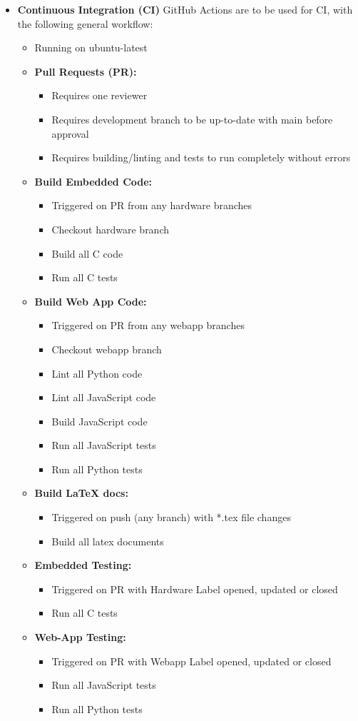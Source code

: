\documentclass{article}
\begin{document}
\begin{itemize}
\item \textbf{Continuous Integration (CI)} GitHub Actions are to be used for CI, with the following general workflow:
\begin{itemize}
    \item Running on ubuntu-latest
    \item \textbf{Pull Requests (PR):} 
    \begin{itemize}
        \item Requires one reviewer
        \item Requires development branch to be up-to-date with main before approval
        \item Requires building/linting and tests to run completely without errors
    \end{itemize}
    \item \textbf{Build Embedded Code:}
    \begin{itemize}
        \item Triggered on PR from any hardware branches
        \item Checkout hardware branch
        \item Build all C code
        \item Run all C tests
    \end{itemize}
    \item \textbf{Build Web App Code:} 
    \begin{itemize}
        \item Triggered on PR from any webapp branches
        \item Checkout webapp branch
        \item Lint all Python code
        \item Lint all JavaScript code
        \item Build JavaScript code
        \item Run all JavaScript tests
        \item Run all Python tests
    \end{itemize}
    \item \textbf{Build LaTeX docs:} 
    \begin{itemize}
        \item Triggered on push (any branch) with *.tex file changes
        \item Build all latex documents
    \end{itemize}
    \item \textbf{Embedded Testing:} 
    \begin{itemize}
        \item Triggered on PR with Hardware Label opened, updated or closed
        \item Run all C tests
    \end{itemize}
    \item \textbf{Web-App Testing:} 
    \begin{itemize}
        \item Triggered on PR with Webapp Label opened, updated or closed
        \item Run all JavaScript tests
        \item Run all Python tests
    \end{itemize}


\end{itemize}
\end{itemize}
\end{document}
